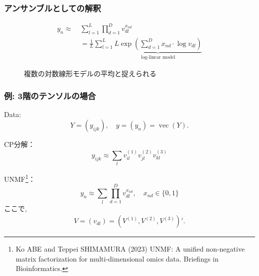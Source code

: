 \documentclass[dvipdfmx, dvipsnames]{beamer}
\begin{document}
\begin{frame}[noframenumbering]
\frametitle{アンサンブルとしての解釈}
\begin{align*}
y_{n}  \approx\ &\sum_{l=1}^L\prod_{d=1}^D v_{dl}^{x_{nd}} \\
&=\frac{1}{L}\sum_{l=1}^L \underbrace{ L\exp\left( \sum_{d=1}^D x_{nd}  \cdot \log v_{dl}\right) }_{\mbox{log-linear model}}
\end{align*}
\begin{figure}
\caption{複数の対数線形モデルの平均と捉えられる}
\end{figure}
\end{frame}

\begin{frame}[noframenumbering]
\frametitle{例: 3階のテンソルの場合}
Data:
$$
 Y=(y_{ijk}), \quad y=(y_n) = \operatorname{vec}(Y) .
$$

CP分解：
\begin{equation*}
y_{ijk} \approx \sum_{l}v_{il}^{(1)} v_{jl}^{(2)} v_{kl}^{(3)}
\end{equation*}

UNMF\footnote{Ko ABE and Teppei SHIMAMURA (2023) UNMF: A unified non-negative matrix factorization for multi-dimensional omics data. Briefings in Bioinformatics. }：
\begin{equation*}
y_{n} \approx \sum_{l}\prod_{d=1}^D v_{dl}^{x_{nd}},  \quad x_{nd} \in \{0,1\}
\end{equation*}
ここで, 
\begin{align*}
V = (v_{dl}) = \left(V^{(1)} , V^{(2)} , V^{(3)}\right)'.
\end{align*}
\end{frame}
\end{document}
